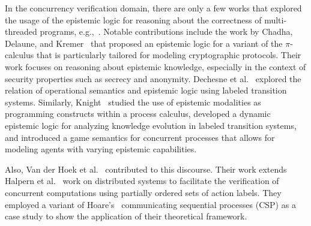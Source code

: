 In the concurrency verification domain, there are only a few works that explored the usage of the epistemic logic for reasoning about the correctness of multi-threaded programs, e.g.,~\cite{DBLP:phd/hal/Knight13,DBLP:conf/forte/ChadhaDK09,DBLP:conf/lpar/DechesneMO07}. Notable contributions include the work by Chadha, Delaune, and Kremer~\cite{DBLP:conf/forte/ChadhaDK09} that proposed an epistemic logic for a variant of the $\pi$-calculus that is particularly tailored for modeling cryptographic protocols. Their work focuses on reasoning about epistemic knowledge, especially in the context of security properties such as secrecy and anonymity. Dechesne et al.~\cite{DBLP:conf/lpar/DechesneMO07} explored the relation of operational semantics and epistemic logic using labeled transition systems. Similarly, Knight~\cite{knight2013epistemic} studied the use of epistemic modalities as programming constructs within a process calculus, developed a dynamic epistemic logic for analyzing knowledge evolution in labeled transition systems, and introduced a game semantics for concurrent processes that allows for modeling agents with varying epistemic capabilities.

Also, Van der Hoek et al.~\cite{DBLP:conf/rex/HoekHM92} contributed to this discourse. Their work extends Halpern et al.~\cite{DBLP:conf/ijcai/HalpernM85,DBLP:journals/jacm/HalpernM90} work on distributed systems to facilitate the verification of concurrent computations using partially ordered sets of action labels. They employed a variant of Hoare's~\cite{DBLP:journals/cacm/Hoare78} communicating sequential processes (CSP) as a case study to show the application of their theoretical framework.